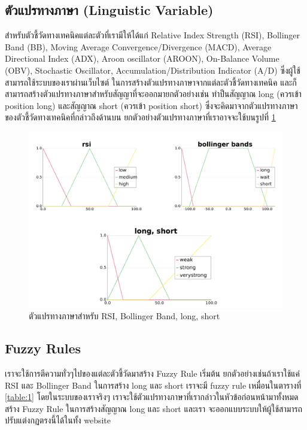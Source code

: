 \subsection{ตัวแปรทางภาษา (Linguistic Variable)}
สำหรับตัวชี้วัดทางเทคนิคแต่ละตัวที่เรามีให้ได้แก่ Relative Index Strength (RSI), Bollinger Band (BB), Moving Average Convergence/Divergence 
(MACD), Average Directional Index (ADX), Aroon oscillator (AROON), On-Balance Volume (OBV), Stochastic Oscillator, 
Accumulation/Distribution Indicator (A/D) ซึ่งผู้ใช้สามารถใช้ระบบของเราผ่านเว็บไซต์ ในการสร้างตัวแปรทางภาษาจากแต่ละตัวชี้วัดทางเทคนิค 
และก็สามารถสร้างตัวแปรทางภาษาสำหรับสัญญาที่จะออกมายกตัวอย่างเช่น ทำป็นสัญญาณ long (ควรเข้า position long) และสัญญาณ short (ควรเข้า position short)
ซึ่งจะคิดมาจากตัวแปรทางภาษาของตัวชี้วัดทางเทคนิคที่กล่าวถึงด้านบน ยกตัวอย่างตัวแปรทางภาษาที่เราอาจจะใช้บนรูปที่ \ref{fig:8} 
\begin{figure}[ht]
    \centering
    \includegraphics[width=\textwidth]{images/linguistic.png}
    \caption{ตัวแปรทางภาษาสำหรับ RSI, Bollinger Band, long, short}
    \label{fig:8}
\end{figure}

\subsection{Fuzzy Rules}
เราจะใช้การตีความทั่วๆไปของแต่ละตัวชี้วัดมาสร้าง Fuzzy Rule เริ่มต้น ยกตัวอย่างเช่นถ้าเราใช้แค่ RSI และ Bollinger Band ในการสร้าง long และ short เราจะมี fuzzy rule 
เหมื่อนในตารางที่ \ref{table:1} โดยในระบบของเราจริงๆ เราจะใช้ตัวแปรทางภาษาที่เรากล่าวในหัวข้อก่อนหน้ามาทั้งหมดสร้าง Fuzzy Rule ในการสร้างสัญญาณ long และ short และเรา
จะออกแบบระบบให้ผู้ใช้สามารถปรับแต่งกฏตรงนี้ได้ในทั้ง website


